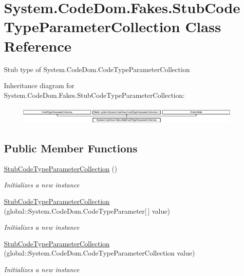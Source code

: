 \hypertarget{class_system_1_1_code_dom_1_1_fakes_1_1_stub_code_type_parameter_collection}{\section{System.\-Code\-Dom.\-Fakes.\-Stub\-Code\-Type\-Parameter\-Collection Class Reference}
\label{class_system_1_1_code_dom_1_1_fakes_1_1_stub_code_type_parameter_collection}
}


Stub type of System.\-Code\-Dom.\-Code\-Type\-Parameter\-Collection 


Inheritance diagram for System.\-Code\-Dom.\-Fakes.\-Stub\-Code\-Type\-Parameter\-Collection\-:\begin{figure}[H]
\begin{center}
\leavevmode
\includegraphics[height=0.969697cm]{class_system_1_1_code_dom_1_1_fakes_1_1_stub_code_type_parameter_collection}
\end{center}
\end{figure}
\subsection*{Public Member Functions}
\begin{DoxyCompactItemize}
\item 
\hyperlink{class_system_1_1_code_dom_1_1_fakes_1_1_stub_code_type_parameter_collection_a313c033e5446ef20ba22e9899aef897d}{Stub\-Code\-Type\-Parameter\-Collection} ()
\begin{DoxyCompactList}\small\item\em Initializes a new instance\end{DoxyCompactList}\item 
\hyperlink{class_system_1_1_code_dom_1_1_fakes_1_1_stub_code_type_parameter_collection_a732ad9bec1181b6c0b32850a2cec1c27}{Stub\-Code\-Type\-Parameter\-Collection} (global\-::\-System.\-Code\-Dom.\-Code\-Type\-Parameter\mbox{[}$\,$\mbox{]} value)
\begin{DoxyCompactList}\small\item\em Initializes a new instance\end{DoxyCompactList}\item 
\hyperlink{class_system_1_1_code_dom_1_1_fakes_1_1_stub_code_type_parameter_collection_a5d845d795610f5e4d0e65dd78432ead2}{Stub\-Code\-Type\-Parameter\-Collection} (global\-::\-System.\-Code\-Dom.\-Code\-Type\-Parameter\-Collection value)
\begin{DoxyCompactList}\small\item\em Initializes a new instance\end{DoxyCompactList}\end{DoxyCompactItemize}
